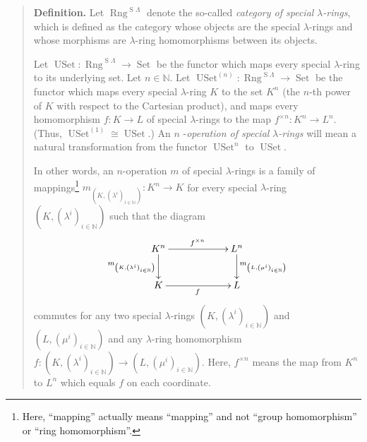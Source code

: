 \documentclass[numbers=enddot,12pt,final,onecolumn,notitlepage]{scrartcl}%
\begin{document}
\begin{quote}
\textbf{Definition.} Let $\operatorname*{Rng}^{\operatorname*{S}\Lambda}$
denote the so-called \textit{category of special }$\lambda$\textit{-rings},
which is defined as the category whose objects are the special $\lambda$-rings
and whose morphisms are $\lambda$-ring homomorphisms between its objects.

Let $\operatorname*{USet}:\operatorname*{Rng}^{\operatorname*{S}\Lambda
}\rightarrow\operatorname*{Set}$ be the functor which maps every special
$\lambda$-ring to its underlying set. Let $n\in\mathbb{N}$. Let
$\operatorname*{USet}\nolimits^{\left(  n\right)  }:\operatorname*{Rng}%
^{\operatorname*{S}\Lambda}\rightarrow\operatorname*{Set}$ be the functor
which maps every special $\lambda$-ring $K$ to the set $K^{n}$ (the $n$-th
power of $K$ with respect to the Cartesian product), and maps every
homomorphism $f:K\rightarrow L$ of special $\lambda$-rings to the map
$f^{\times n}:K^{n}\rightarrow L^{n}$. (Thus, $\operatorname*{USet}%
\nolimits^{\left(  1\right)  }\cong\operatorname*{USet}$.) An $n$%
-\textit{operation of special }$\lambda$\textit{-rings} will mean a natural
transformation from the functor $\operatorname*{USet}^{n}$ to
$\operatorname*{USet}$.

In other words, an $n$-operation $m$ of special $\lambda$-rings is a family of
mappings\footnote{Here, ``mapping'' actually means ``mapping'' and not ``group
homomorphism'' or ``ring homomorphism''.} $m_{\left(  K,\left(  \lambda
^{i}\right)  _{i\in\mathbb{N}}\right)  }:K^{n}\rightarrow K$ for every special
$\lambda$-ring $\left(  K,\left(  \lambda^{i}\right)  _{i\in\mathbb{N}%
}\right)  $ such that the diagram%
\begin{equation}
\xymatrixcolsep{5pc}\xymatrix{ K^n \ar[r]^{f^{\times n}} \ar[d]_{m_{\left(K,\left(\lambda^i\right)_{i\in\mathbb{N}}\right)}} & L^n \ar[d]^{m_{\left(L,\left(\mu^i\right)_{i\in\mathbb{N}}\right)}} \\ K \ar[r]_f & L }
\label{I-oper}%
\end{equation}
commutes for any two special $\lambda$-rings $\left(  K,\left(  \lambda
^{i}\right)  _{i\in\mathbb{N}}\right)  $ and $\left(  L,\left(  \mu
^{i}\right)  _{i\in\mathbb{N}}\right)  $ and any $\lambda$-ring homomorphism
$f:\left(  K,\left(  \lambda^{i}\right)  _{i\in\mathbb{N}}\right)
\rightarrow\left(  L,\left(  \mu^{i}\right)  _{i\in\mathbb{N}}\right)  $.
Here, $f^{\times n}$ means the map from $K^{n}$ to $L^{n}$ which equals $f$ on
each coordinate.
\end{quote}
\end{document}
